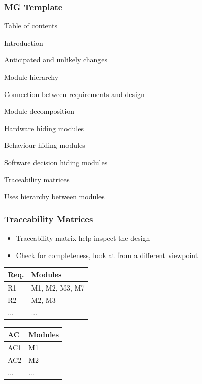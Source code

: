 \documentclass[t,12pt,numbers,fleqn]{beamer}
\begin{document}


\begin{frame}
\frametitle{MG Template}

\bi
\item Table of contents
\item Introduction
\item Anticipated and unlikely changes
\item Module hierarchy
\item Connection between requirements and design
\item Module decomposition
\bi
\item Hardware hiding modules
\item Behaviour hiding modules
\item Software decision hiding modules
\ei
\item Traceability matrices
\item Uses hierarchy between modules
\ei

\end{frame}


\begin{frame}
\frametitle{Traceability Matrices}
\begin{itemize}
\item Traceability matrix help inspect the design
\item Check for completeness, look at from a different viewpoint
\end{itemize}
\begin{table}[H]
\centering
\begin{tabular}{p{} p{}}
\toprule
\textbf{Req.} & \textbf{Modules}\\
\midrule
R1 & M1, M2, M3, M7\\
R2 & M2, M3\\
...& ...\\
\bottomrule
\end{tabular}
\end{table}

\begin{table}[H]
\centering
\begin{tabular}{p{} p{}}
\toprule
\textbf{AC} & \textbf{Modules}\\
\midrule
AC1 & M1\\
AC2 & M2\\
... & ...\\
\bottomrule
\end{tabular}
\end{table}

\end{frame}
\end{document}
